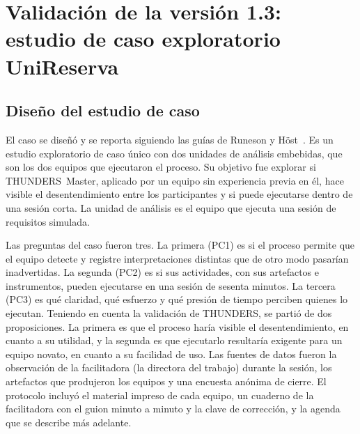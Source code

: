 \documentclass[12pt,letterpaper,oneside]{report}
\begin{document}
\section{Validación de la versión 1.3: estudio de caso exploratorio UniReserva}
\label{sec:unireserva}

\subsection{Diseño del estudio de caso}
El caso se diseñó y se reporta siguiendo las guías de Runeson y
Höst~\cite{runeson2009case}. Es un estudio exploratorio de caso único con dos
unidades de análisis embebidas, que son los dos equipos que ejecutaron el
proceso. Su objetivo fue explorar si THUNDERS~Master, aplicado por un equipo sin
experiencia previa en él, hace visible el desentendimiento entre los
participantes y si puede ejecutarse dentro de una sesión corta. La unidad de
análisis es el equipo que ejecuta una sesión de requisitos simulada.

Las preguntas del caso fueron tres. La primera (PC1) es si el proceso permite que
el equipo detecte y registre interpretaciones distintas que de otro modo pasarían
inadvertidas. La segunda (PC2) es si sus actividades, con sus artefactos e
instrumentos, pueden ejecutarse en una sesión de sesenta minutos. La tercera
(PC3) es qué claridad, qué esfuerzo y qué presión de tiempo perciben quienes lo
ejecutan. Teniendo en cuenta la validación de THUNDERS, se partió de dos
proposiciones. La primera es que el proceso haría visible el desentendimiento,
en cuanto a su utilidad, y la segunda es que ejecutarlo resultaría exigente para
un equipo novato, en cuanto a su facilidad de uso. Las fuentes de datos fueron la observación de la
facilitadora (la directora del trabajo) durante la sesión, los artefactos que produjeron los equipos y una
encuesta anónima de cierre. El protocolo incluyó el material impreso de cada
equipo, un cuaderno de la facilitadora con el guion minuto a minuto y la clave de
corrección, y la agenda que se describe más adelante.
\end{document}
